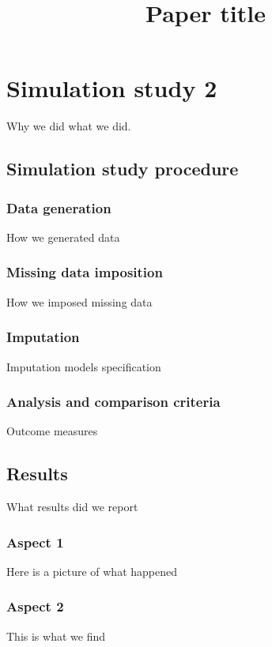 \documentclass[a4paper,man]{apa6}\usepackage[]{graphicx}\usepackage[]{xcolor}
\title{Paper title}
\newcommand{\pathBIB}{./bib}
\begin{document}
  	\maketitle

    \linenumbers

    
\section{Simulation study 2}

	Why we did what we did.

\subsection{Simulation study procedure}

\subsubsection{Data generation}

	How we generated data	

\subsubsection{Missing data imposition}\label{sub-missing}

	How we imposed missing data	

\subsubsection{Imputation}

	Imputation models specification

\subsubsection{Analysis and comparison criteria}\label{criteria}

	Outcome measures

\subsection{Results}
	
	What results did we report

\subsubsection{Aspect 1}

	Here is a picture of what happened

\subsubsection{Aspect 2}

	This is what we find

    
\end{document}
